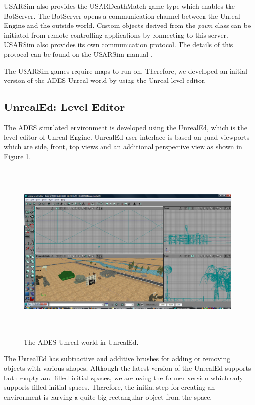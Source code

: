 \documentclass[a4paper,oneside,12pt]{report}
\begin{document}
USARSim also provides the USARDeathMatch game type which enables the BotServer. The BotServer opens a communication channel between the Unreal Engine and the outside world. Custom objects derived from the \textit{pawn} class can be initiated from remote controlling applications by connecting to this server. USARSim also provides its own communication protocol. The details of this protocol can be found on the USARSim manual \cite{carpin_usarsim:_2007}.

The USARSim games require maps to run on. Therefore, we developed an initial version of the ADES Unreal world by using the Unreal level editor.

\subsection{UnrealEd: Level Editor}

The ADES simulated environment is developed using the UnrealEd, which is the level editor of Unreal Engine. UnrealEd user interface is based on quad viewports which are side, front, top views and an additional perspective view as shown in Figure \ref{fig:UnrealEdQuad}.

\begin{figure}[ht]
\begin{center}
\includegraphics[width=150mm,height=90mm]{img/UnrealEdQuad.eps}
\caption{The ADES Unreal world in UnrealEd.}
\label{fig:UnrealEdQuad}
\end{center}
\end{figure}

The UnrealEd has subtractive and additive brushes for adding or removing objects with various shapes. Although the latest version of the UnrealEd supports both empty and filled initial spaces, we are using the former version which only supports filled initial spaces. Therefore, the initial step for creating an environment is carving a quite big rectangular object from the space.
\end{document}
